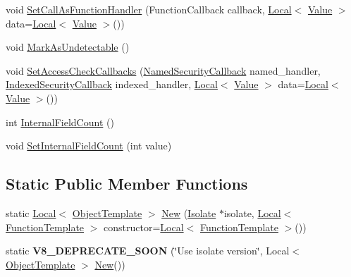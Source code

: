 \begin{DoxyCompactItemize}
\item 
void \hyperlink{classv8_1_1ObjectTemplate_a1775c8f73e643c339804d2f5b628eddf}{Set\+Call\+As\+Function\+Handler} (Function\+Callback callback, \hyperlink{classv8_1_1Local}{Local}$<$ \hyperlink{classv8_1_1Value}{Value} $>$ data=\hyperlink{classv8_1_1Local}{Local}$<$ \hyperlink{classv8_1_1Value}{Value} $>$())
\item 
void \hyperlink{classv8_1_1ObjectTemplate_a7e40ef313b44c2ad336c73051523b4f8}{Mark\+As\+Undetectable} ()
\item 
void \hyperlink{classv8_1_1ObjectTemplate_a973635b9f6cad297cdc50ee67b07e20f}{Set\+Access\+Check\+Callbacks} (\hyperlink{namespacev8_ab5cafda0c556bba990c660ce9c904e0d}{Named\+Security\+Callback} named\+\_\+handler, \hyperlink{namespacev8_aebbcc7837753e51112d944ad96520da1}{Indexed\+Security\+Callback} indexed\+\_\+handler, \hyperlink{classv8_1_1Local}{Local}$<$ \hyperlink{classv8_1_1Value}{Value} $>$ data=\hyperlink{classv8_1_1Local}{Local}$<$ \hyperlink{classv8_1_1Value}{Value} $>$())
\item 
int \hyperlink{classv8_1_1ObjectTemplate_a43de785d594d8c01b18230b1aa79e31c}{Internal\+Field\+Count} ()
\item 
void \hyperlink{classv8_1_1ObjectTemplate_ab63916ac584a76bca8ba541f86ce9fce}{Set\+Internal\+Field\+Count} (int value)
\end{DoxyCompactItemize}
\subsection*{Static Public Member Functions}
\begin{DoxyCompactItemize}
\item 
static \hyperlink{classv8_1_1Local}{Local}$<$ \hyperlink{classv8_1_1ObjectTemplate}{Object\+Template} $>$ \hyperlink{classv8_1_1ObjectTemplate_ae0bcd58e9e069c50148c377d774de7a1}{New} (\hyperlink{classv8_1_1Isolate}{Isolate} $\ast$isolate, \hyperlink{classv8_1_1Local}{Local}$<$ \hyperlink{classv8_1_1FunctionTemplate}{Function\+Template} $>$ constructor=\hyperlink{classv8_1_1Local}{Local}$<$ \hyperlink{classv8_1_1FunctionTemplate}{Function\+Template} $>$())
\item 
\hypertarget{classv8_1_1ObjectTemplate_ade467a6adf3a65bfdef9e4db7ced8e0f}{}static {\bfseries V8\+\_\+\+D\+E\+P\+R\+E\+C\+A\+T\+E\+\_\+\+S\+O\+O\+N} (\char`\"{}Use isolate version\char`\"{}, Local$<$ \hyperlink{classv8_1_1ObjectTemplate}{Object\+Template} $>$ \hyperlink{classv8_1_1ObjectTemplate_ae0bcd58e9e069c50148c377d774de7a1}{New}())\label{classv8_1_1ObjectTemplate_ade467a6adf3a65bfdef9e4db7ced8e0f}

\end{DoxyCompactItemize}
